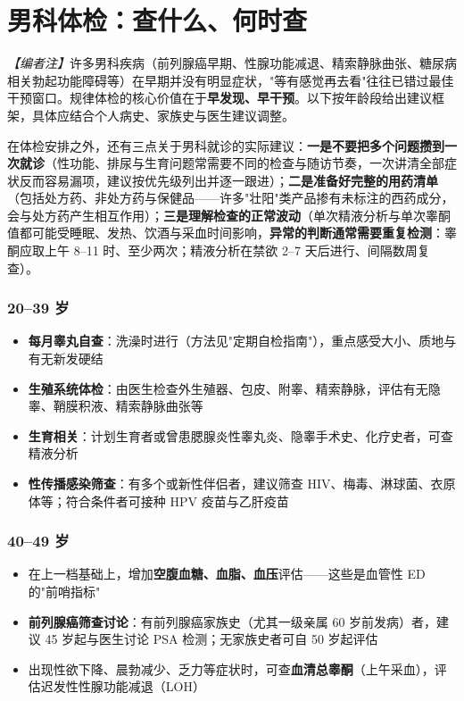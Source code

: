 \documentclass[12pt,a4paper,twoside]{ctexbook}
\begin{document}
\section{男科体检：查什么、何时查}


\noindent\textit{【编者注】}许多男科疾病（前列腺癌早期、性腺功能减退、精索静脉曲张、糖尿病相关勃起功能障碍等）在早期并没有明显症状，"等有感觉再去看"往往已错过最佳干预窗口。规律体检的核心价值在于\textbf{早发现、早干预}。以下按年龄段给出建议框架，具体应结合个人病史、家族史与医生建议调整。


在体检安排之外，还有三点关于男科就诊的实际建议：\textbf{一是不要把多个问题攒到一次就诊}（性功能、排尿与生育问题常需要不同的检查与随访节奏，一次讲清全部症状反而容易漏项，建议按优先级列出并逐一跟进）；\textbf{二是准备好完整的用药清单}（包括处方药、非处方药与保健品——许多"壮阳"类产品掺有未标注的西药成分，会与处方药产生相互作用）；\textbf{三是理解检查的正常波动}（单次精液分析与单次睾酮值都可能受睡眠、发热、饮酒与采血时间影响，\textbf{异常的判断通常需要重复检测}：睾酮应取上午 8--11 时、至少两次；精液分析在禁欲 2--7 天后进行、间隔数周复查）。

\subsubsection{20--39 岁}

\begin{itemize}
	\item \textbf{每月睾丸自查}：洗澡时进行（方法见"定期自检指南"），重点感受大小、质地与有无新发硬结
	\item \textbf{生殖系统体检}：由医生检查外生殖器、包皮、附睾、精索静脉，评估有无隐睾、鞘膜积液、精索静脉曲张等
	\item \textbf{生育相关}：计划生育者或曾患腮腺炎性睾丸炎、隐睾手术史、化疗史者，可查精液分析
	\item \textbf{性传播感染筛查}：有多个或新性伴侣者，建议筛查 HIV、梅毒、淋球菌、衣原体等；符合条件者可接种 HPV 疫苗与乙肝疫苗
\end{itemize}

\subsubsection{40--49 岁}

\begin{itemize}
	\item 在上一档基础上，增加\textbf{空腹血糖、血脂、血压}评估——这些是血管性 ED 的"前哨指标"
	\item \textbf{前列腺癌筛查讨论}：有前列腺癌家族史（尤其一级亲属 60 岁前发病）者，建议 45 岁起与医生讨论 PSA 检测；无家族史者可自 50 岁起评估
	\item 出现性欲下降、晨勃减少、乏力等症状时，可查\textbf{血清总睾酮}（上午采血），评估迟发性性腺功能减退（LOH）
\end{itemize}
\end{document}
